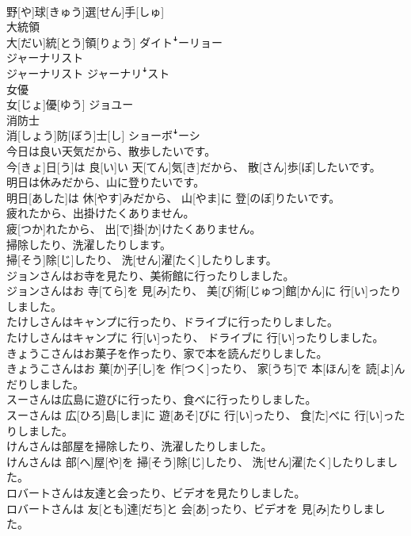 \documentclass[8pt]{extreport}
\begin{document}
\begin{CJK}{UTF8}{min}
\\	野[や]球[きゅう]選[せん]手[しゅ]	
\\	大統領	
\\	大[だい]統[とう]領[りょう]	ダイトꜜーリョー
\\	ジャーナリスト	
\\	ジャーナリスト	ジャーナリꜜスト
\\	女優	
\\	女[じょ]優[ゆう]	ジョユー
\\	消防士	
\\	消[しょう]防[ぼう]士[し]	ショーボꜜーシ
\\	今日は良い天気だから、散歩したいです。	
\\	今[きょ]日[う]は 良[い]い 天[てん]気[き]だから、 散[さん]歩[ぽ]したいです。
\\	明日は休みだから、山に登りたいです。	
\\	明日[あした]は 休[やす]みだから、 山[やま]に 登[のぼ]りたいです。
\\	疲れたから、出掛けたくありません。	
\\	疲[つか]れたから、 出[で]掛[か]けたくありません。
\\	掃除したり、洗濯したりします。	
\\	掃[そう]除[じ]したり、 洗[せん]濯[たく]したりします。
\\	ジョンさんはお寺を見たり、美術館に行ったりしました。	
\\	ジョンさんはお 寺[てら]を 見[み]たり、 美[び]術[じゅつ]館[かん]に 行[い]ったりしました。
\\	たけしさんはキャンプに行ったり、ドライブに行ったりしました。	
\\	たけしさんはキャンプに 行[い]ったり、 ドライブに 行[い]ったりしました。
\\	きょうこさんはお菓子を作ったり、家で本を読んだりしました。	
\\	きょうこさんはお 菓[か]子[し]を 作[つく]ったり、 家[うち]で 本[ほん]を 読[よ]んだりしました。
\\	スーさんは広島に遊びに行ったり、食べに行ったりしました。	
\\	スーさんは 広[ひろ]島[しま]に 遊[あそ]びに 行[い]ったり、 食[た]べに 行[い]ったりしました。
\\	けんさんは部屋を掃除したり、洗濯したりしました。	
\\	けんさんは 部[へ]屋[や]を 掃[そう]除[じ]したり、 洗[せん]濯[たく]したりしました。
\\	ロバートさんは友達と会ったり、ビデオを見たりしました。	
\\	ロバートさんは 友[とも]達[だち]と 会[あ]ったり、ビデオを 見[み]たりしました。

\end{CJK}
\end{document}
